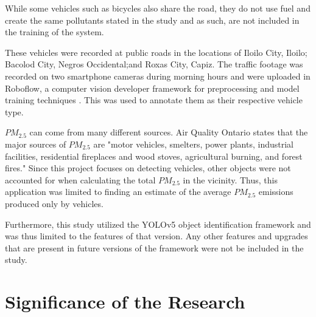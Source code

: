 While some vehicles such as bicycles also share the road, they do not use fuel and create the same pollutants stated in the study and as such, are not included in the training of the system. 

 These vehicles were recorded at public roads in the locations of Iloilo City, Iloilo; Bacolod City, Negros Occidental;and Roxas City, Capiz. The traffic footage was recorded on two smartphone cameras during morning hours and were uploaded in Roboflow, a computer vision developer framework for  preprocessing and model training techniques \cite{Bhattacharyya_2020}. This was used to annotate them as their respective vehicle type. 

 $PM_{2.5}$ can come from many different sources. Air Quality Ontario \citeyear{MECP_nd} states that the major sources of  $PM_{2.5}$ are "motor vehicles, smelters, power plants, industrial facilities, residential fireplaces and wood stoves, agricultural burning, and forest fires." Since this project focuses on detecting vehicles, other objects were not accounted for when calculating the total $PM_{2.5}$ in the vicinity. Thus, this application was limited to finding an estimate of the average $PM_{2.5}$ emissions produced only by vehicles.

Furthermore, this study utilized the YOLOv5 object identification framework and was thus limited to the features of that version. Any other features and upgrades that are present in future versions of the framework were not be included in the study. 



\begin{comment}

%
%
Generally, one paragraph should be allotted for each of your research objectives.

Each paragraph contains a brief overview of the concept/theory and the purpose of doing the associated objective.

Each paragraph also includes a description of the scope/limitation of your study.

* Please refer to the slides for examples.

\end{comment}


\section{Significance of the Research}
\label{sec:significance}

